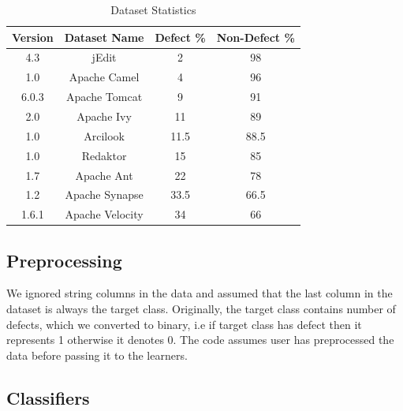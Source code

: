 \documentclass[10pt,conference]{IEEEtran}
\theoremstyle{break}
\theoremstyle{break}
\begin{document}
 \begin{table}[!htbp]
\begin{center}
\begin{tabular}{|c|c|c|c|}
\hline 
\textbf{Version} & \textbf{Dataset Name} &  \textbf{Defect \%} & \textbf{Non-Defect \%}\\[0.5ex]
\hline
4.3 & jEdit & 2 & 98 \\
\hline
1.0 & Apache Camel & 4 & 96 \\ 
\hline
6.0.3 & Apache Tomcat & 9 & 91 \\
\hline
2.0 & Apache Ivy & 11 & 89 \\ 
\hline
1.0 & Arcilook & 11.5 & 88.5\\
\hline
1.0 & Redaktor & 15 & 85 \\
\hline
1.7 & Apache Ant & 22 & 78 \\ 
\hline
1.2 & Apache Synapse & 33.5 & 66.5 \\
\hline
1.6.1 & Apache Velocity & 34 & 66 \\
\hline
\end{tabular}
\end{center}
\caption{Dataset Statistics}
\label{tb:dataset}
\vspace{-0.7cm}
\end{table}

\subsection{\textbf{Preprocessing}}
 We ignored  string columns in the data and assumed that the last column in the dataset is always the target class. Originally, the target class contains number of defects, which we converted to binary, i.e if target class has defect then it represents 1 otherwise it denotes 0. The code assumes user has preprocessed the data before passing it to the learners. 

\subsection{\textbf{Classifiers}}
\label{sect:classes}
\end{document}
